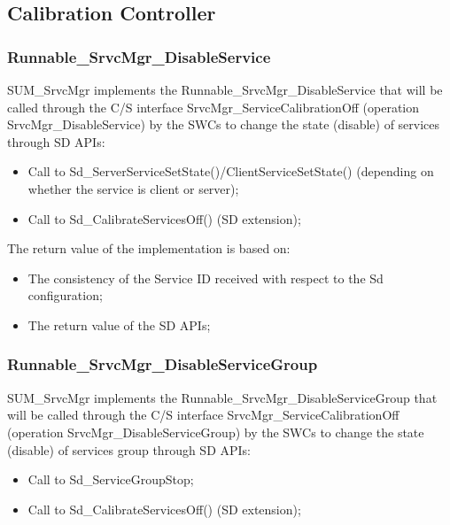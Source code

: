 {\subsection{Calibration Controller}
\label{subsec:CalibControllerDynamic}

\subsubsection{Runnable\_SrvcMgr\_DisableService}

SUM\_SrvcMgr implements the Runnable\_SrvcMgr\_DisableService that will be called through the C/S interface SrvcMgr\_ServiceCalibrationOff (operation SrvcMgr\_DisableService) 
by the SWCs to change the state (disable) of services through SD APIs:

\begin{itemize}
\item Call to Sd\_ServerServiceSetState()/ClientServiceSetState() (depending on whether the service is client or server);  
\item Call to Sd\_CalibrateServicesOff() (SD extension);
\end{itemize}

The return value of the implementation is based on:

\begin{itemize}
\item The consistency of the Service ID received with respect to the Sd configuration;
\item The return value of the SD APIs;
\end{itemize}


{  }

\subsubsection{Runnable\_SrvcMgr\_DisableServiceGroup}

SUM\_SrvcMgr implements the Runnable\_SrvcMgr\_DisableServiceGroup that will be called through the C/S interface SrvcMgr\_ServiceCalibrationOff (operation SrvcMgr\_DisableServiceGroup) 
by the SWCs to change the state (disable) of services group through SD APIs:

\begin{itemize}
\item Call to Sd\_ServiceGroupStop;  
\item Call to Sd\_CalibrateServicesOff() (SD extension);
\end{itemize}

}
